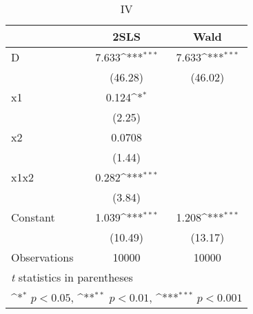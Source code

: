 \begin{table}[htbp]\centering
\def\sym#1{\ifmmode^{#1}\else\(^{#1}\)\fi}
\caption{IV\label{tab:IV-2SLS-IV-Wald}}
\begin{tabular}{l*{2}{c}}
\toprule
                    &\multicolumn{1}{c}{2SLS}&\multicolumn{1}{c}{Wald}\\
\midrule
D                   &       7.633\sym{***}&       7.633\sym{***}\\
                    &     (46.28)         &     (46.02)         \\
\addlinespace
x1                  &       0.124\sym{*}  &                     \\
                    &      (2.25)         &                     \\
\addlinespace
x2                  &      0.0708         &                     \\
                    &      (1.44)         &                     \\
\addlinespace
x1x2                &       0.282\sym{***}&                     \\
                    &      (3.84)         &                     \\
\addlinespace
Constant            &       1.039\sym{***}&       1.208\sym{***}\\
                    &     (10.49)         &     (13.17)         \\
\midrule
Observations        &       10000         &       10000         \\
\bottomrule
\multicolumn{3}{l}{\footnotesize \textit{t} statistics in parentheses}\\
\multicolumn{3}{l}{\footnotesize \sym{*} \(p<0.05\), \sym{**} \(p<0.01\), \sym{***} \(p<0.001\)}\\
\end{tabular}
\end{table}
